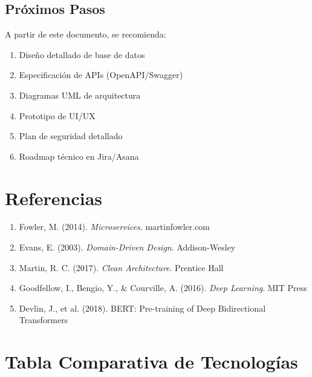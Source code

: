 \documentclass[12pt,a4paper,spanish]{article}
\begin{document}
\subsection{Próximos Pasos}

A partir de este documento, se recomienda:

\begin{enumerate}
    \item Diseño detallado de base de datos
    \item Especificación de APIs (OpenAPI/Swagger)
    \item Diagramas UML de arquitectura
    \item Prototipo de UI/UX
    \item Plan de seguridad detallado
    \item Roadmap técnico en Jira/Asana
\end{enumerate}

\newpage

\section{Referencias}

\begin{enumerate}
    \item Fowler, M. (2014). \textit{Microservices}. martinfowler.com
    \item Evans, E. (2003). \textit{Domain-Driven Design}. Addison-Wesley
    \item Martin, R. C. (2017). \textit{Clean Architecture}. Prentice Hall
    \item Goodfellow, I., Bengio, Y., \& Courville, A. (2016). \textit{Deep Learning}. MIT Press
    \item Devlin, J., et al. (2018). BERT: Pre-training of Deep Bidirectional Transformers
\end{enumerate}

\appendix

\section{Tabla Comparativa de Tecnologías}
\end{document}
